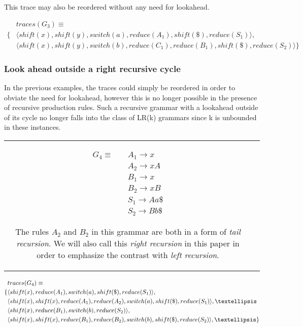 \documentclass[a4paper,11pt]{article}
\begin{document}
This trace may also be reordered without any need for lookahead.

{\small\parbox{.3\textwidth}{\begin{align*}
&traces(G_3) \equiv \\
\{ & \langle shift(x), shift(y), switch(a), reduce(A_1), shift(\$), reduce(S_1) \rangle,\\
   & \langle shift(x), shift(y), switch(b), reduce(C_1), reduce(B_1), shift(\$), reduce(S_2) \rangle \}
\end{align*}}}

\subsubsection{Look ahead outside a right recursive cycle}
In the previous examples, the traces could simply be reordered in order to obviate the need for lookahead, however this is no longer possible in the presence of recursive production rules.
Such a recursive grammar with a lookahead outside of its cycle no longer falls into the class of LR(k) grammars since k is unbounded in these instances.

\begin{tabular}[t]{cl}
\parbox{.3\textwidth}{
\begin{align*}
G_4 \equiv \quad & A_1 \rightarrow x\\
                 & A_2 \rightarrow x A\\
                 & B_1 \rightarrow x\\
                 & B_2 \rightarrow x B\\
                 & S_1 \rightarrow A a \$\\
                 & S_2 \rightarrow B b \$
\end{align*}}
\parbox{.6\textwidth}{The rules $A_2$ and $B_2$ in this grammar are both in a form of \emph{tail recursion}. 
We will also call this \emph{right recursion} in this paper in order to emphasize the contrast with \emph{left recursion}.}
\end{tabular}

{\small\parbox{.3\textwidth}{\begin{align*}
&traces(G_4) \equiv \\
\{ & \langle shift(x), reduce(A_1), switch(a), shift(\$), reduce(S_1) \rangle,\\
   & \langle shift(x), shift(x), reduce(A_1), reduce(A_2), switch(a), shift(\$), reduce(S_1) \rangle, \textellipsis \\
   & \langle shift(x), reduce(B_1), switch(b), reduce(S_2) \rangle,\\
   & \langle shift(x), shift(x), reduce(B_1), reduce(B_2), switch(b), shift(\$), reduce(S_2) \rangle, \textellipsis \}
\end{align*}}}
\end{document}
